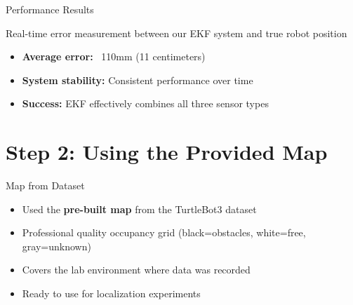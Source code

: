 \documentclass[10pt]{beamer}
\begin{document}
\begin{frame}{Performance Results}
\centering
{}

\vspace{2mm}
{\scriptsize Real-time error measurement between our EKF system and true robot position}

\vspace{3mm}
\begin{itemize}
    \item \textbf{Average error:} ~110mm (11 centimeters)
    \item \textbf{System stability:} Consistent performance over time
    \item \textbf{Success:} EKF effectively combines all three sensor types
\end{itemize}
\end{frame}

\section{Step 2: Using the Provided Map}

\begin{frame}{Map from Dataset}
\begin{itemize}
    \item Used the \textbf{pre-built map} from the TurtleBot3 dataset
    \item Professional quality occupancy grid (black=obstacles, white=free, gray=unknown)
    \item Covers the lab environment where data was recorded
    \item Ready to use for localization experiments
\end{itemize}

\begin{center}
\end{center}
\end{frame}
\end{document}
